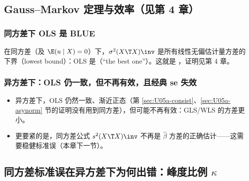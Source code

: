 \subsection{Gauss--Markov 定理与效率（见第 4 章）}

\subsubsection{同方差下 OLS 是 BLUE}

在同方差（及 $\E(u\mid X)=0$）下，$\sigma^2(X\T X)\inv$ 是所有线性无偏估计量方差的下界（lowest bound）：OLS 是（“the best one”）。这就是 ，证明见第 4 章。

\subsubsection{异方差下：OLS 仍一致，但不再有效，且经典 se 失效}

\begin{itemize}
\item 异方差下，OLS 仍然一致、渐近正态（第 \ref{sec:U05a-consist}、\ref{sec:U05a-asynorm} 节的证明没有用到同方差），但可能不再有效：GLS/WLS 的方差更小。
\item 更要紧的是，同方差公式 $s^2(X\T X)\inv$ 不再是 $\hat\beta$ 方差的正确估计——这需要稳健标准误（本章下一节）。
\end{itemize}

\subsection{同方差标准误在异方差下为何出错：峰度比例 \texorpdfstring{$\kappa$}{kappa}}

